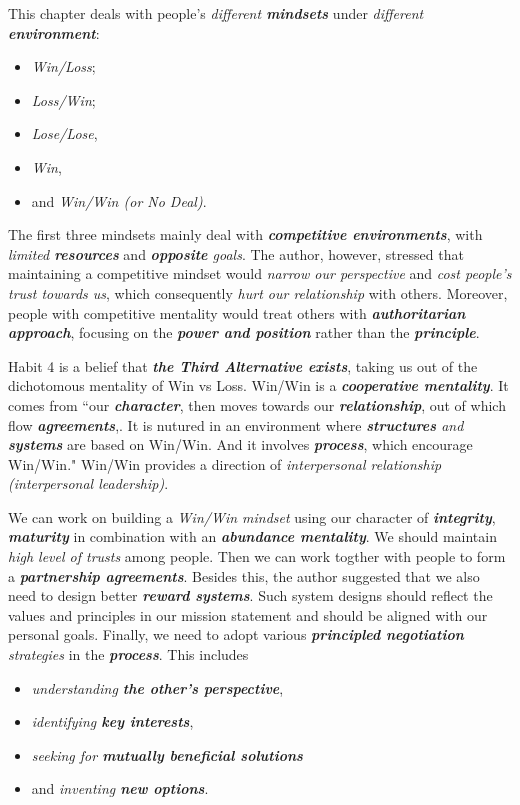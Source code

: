 \documentclass[11pt]{article}
\begin{document}
\begin{enumerate}
\begin{enumerate}
This chapter deals with people's \emph{different \textbf{mindsets}} under \emph{different \textbf{environment}}:
\begin{itemize}
\item \emph{Win/Loss};
\item \emph{Loss/Win};
\item \emph{Lose/Lose}, 
\item \emph{Win}, 
\item and \emph{Win/Win (or No Deal)}.
\end{itemize} The first three mindsets mainly deal with \emph{\textbf{competitive environments}}, with \emph{limited \textbf{resources}} and \emph{\textbf{opposite} goals}. The author, however, stressed that maintaining a competitive mindset would \emph{narrow our perspective} and \emph{cost people's trust towards us}, which consequently \emph{hurt our relationship} with others. Moreover, people with competitive mentality would treat others with \emph{\textbf{authoritarian approach}}, focusing on the \emph{\textbf{power and position}} rather than the \emph{\textbf{principle}}.

Habit 4 is a belief that \emph{\textbf{the Third Alternative exists}}, taking us out of the dichotomous mentality of Win vs Loss. Win/Win is a \emph{\textbf{cooperative mentality}}. It comes from ``our \emph{\textbf{character}}, then moves towards our \emph{\textbf{relationship}}, out of which flow \emph{\textbf{agreements}},. It is nutured in an environment where \emph{\textbf{structures} and \textbf{systems}} are based on Win/Win. And it involves \textbf{\emph{process}}, which encourage Win/Win." Win/Win provides a direction of \emph{interpersonal relationship (interpersonal leadership)}. 


We can work on building a \emph{Win/Win mindset} using our character of \emph{\textbf{integrity}}, \emph{\textbf{maturity}} in combination with an \emph{\textbf{abundance mentality}}. We should maintain \emph{high level of trusts} among people. Then we can work togther with people to form a \emph{\textbf{partnership agreements}}. Besides this, the author suggested that we also need to design better \emph{\textbf{reward systems}}. Such system designs should reflect the values and principles in our mission statement and should be aligned with our personal goals. Finally, we need to adopt various \emph{\textbf{principled negotiation} strategies} in the \emph{\textbf{process}}. This includes
\begin{itemize}
\item \emph{understanding \textbf{the other's perspective}}, 
\item \emph{identifying \textbf{key interests}},
\item \emph{seeking for \textbf{mutually beneficial solutions}}
\item and \emph{inventing \textbf{new options}}.
\end{itemize}


\end{enumerate}
\end{enumerate}
\end{document}
